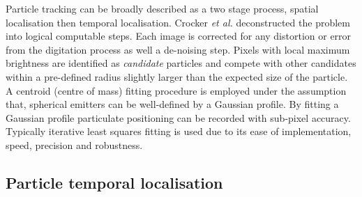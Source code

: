 Particle tracking can be broadly described as a two stage process, spatial localisation then temporal localisation.
Crocker \emph{et al.} deconstructed the problem into logical computable steps.
Each image is %
corrected for any distortion or error from the digitation process as well a de-noising step. %
Pixels with local maximum brightness are identified as \emph{candidate} particles and compete with other candidates within a pre-defined radius slightly larger than the expected size of the particle.
A centroid (centre of mass) fitting procedure is employed under the assumption that, %
spherical emitters can be well-defined by a Gaussian profile.
By fitting a Gaussian profile %
particulate positioning can be recorded with sub-pixel accuracy.
Typically iterative least squares fitting is used %
due to its ease of implementation, speed, precision and robustness.%

%


\subsection{Particle temporal localisation}

